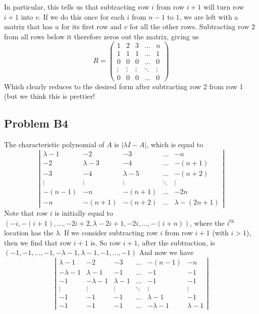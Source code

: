 \documentclass{article}
\begin{document}
In particular, this tells us that subtracting row $i$ from row $i+1$ will turn row $i+1$ into $v$.
If we do this once for each $i$ from $n-1$ to $1$, we are left with a matrix that has $u$
for its first row and $v$ for all the other rows.
Subtracting row $2$ from all rows below it therefore zeros out the matrix, giving us
\[
R = \left(
\begin{array}{ccccc}
1 & 2 & 3 & \dots & n\\
1 & 1 & 1 & \dots & 1\\
0 & 0 & 0 & \dots & 0\\
\vdots & \vdots & \vdots & \ddots & \vdots\\
0 & 0 & 0 & \dots & 0
\end{array}
\right)
\]
Which clearly reduces to the desired form after subtracting row 2 from row 1 (but we think this is prettier!

\subsection{Problem B4}
The characteristic polynomial of $A$ is $|\lambda I - A|$, which is equal to 
\[
\left|
\begin{array}{ccccc}
\lambda - 1 & -2 & -3 & \dots & -n\\
-2 & \lambda - 3 & -4 & \dots & -(n+1)\\
-3 & -4 & \lambda -5 & \dots & -(n+2)\\
\vdots & \vdots & \vdots & \ddots & \vdots\\
-(n-1) & -n & -(n+1) & \dots & -2n\\
-n & -(n+1) & -(n+2) & \dots & \lambda -(2n + 1)
\end{array}
\right|
\]
Note that row $i$ is initially equal to
$(-i, -(i+1),\dots,-2i + 2, \lambda - 2i +1, -2i,\dots, -(i + n))$,
where the $i^{\text{th}}$ location has the $\lambda$.
If we consider subtracting row $i$ from row $i+1$ (with $i > 1$), then we find that row $i+1$ is.
So row $i+1$, after the subtraction, is 
$(-1, -1, \dots, -1, -\lambda -1, \lambda - 1, -1, \dots, -1)$
And now we have
\[
\left|
\begin{array}{cccccc}
\lambda - 1 & -2 & -3 & \dots & -(n-1)& -n\\
-\lambda - 1 & \lambda - 1 & -1 & \dots & -1 & -1\\
-1 & -\lambda - 1 & \lambda - 1 & \dots & -1 & -1\\
\vdots & \vdots & \vdots & \ddots & \vdots & \vdots\\
-1 & -1 & -1 & \dots & \lambda -1 & -1 \\
-1 & -1 & -1 & \dots & -\lambda - 1 & \lambda -1
\end{array}
\right|
\]
\end{document}
